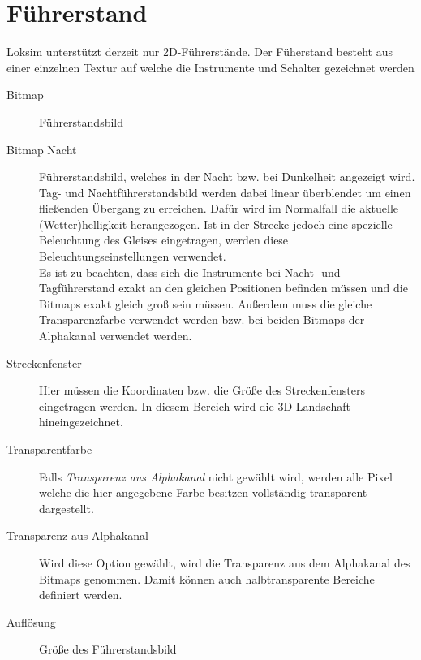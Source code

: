 \section{Führerstand}
\label{sect.editor.lok.fst}
Loksim unterstützt derzeit nur 2D-Führerstände. Der Füherstand besteht aus einer einzelnen Textur auf welche die Instrumente und Schalter gezeichnet werden
\begin{description}
\item[Bitmap] Führerstandsbild
\item[Bitmap Nacht] Führerstandsbild, welches in der Nacht bzw. bei Dunkelheit angezeigt wird. Tag- und Nachtführerstandsbild werden dabei linear überblendet um einen fließenden Übergang zu erreichen. Dafür wird im Normalfall die aktuelle (Wetter)helligkeit herangezogen. Ist in der Strecke jedoch eine spezielle Beleuchtung des Gleises eingetragen, werden diese Beleuchtungseinstellungen verwendet.\\
Es ist zu beachten, dass sich die Instrumente bei Nacht- und Tagführerstand exakt an den gleichen Positionen befinden müssen und die Bitmaps exakt gleich groß sein müssen. Außerdem muss die gleiche Transparenzfarbe verwendet werden bzw. bei beiden Bitmaps der Alphakanal verwendet werden.
\item[Streckenfenster] Hier müssen die Koordinaten bzw. die Größe des Streckenfensters eingetragen werden. In diesem Bereich wird die 3D-Landschaft hineingezeichnet.
\item[Transparentfarbe] Falls \emph{Transparenz aus Alphakanal} nicht gewählt wird, werden alle Pixel welche die hier angegebene Farbe besitzen vollständig transparent dargestellt.
\item[Transparenz aus Alphakanal] Wird diese Option gewählt, wird die Transparenz aus dem Alphakanal des Bitmaps genommen. Damit können auch halbtransparente Bereiche definiert werden.
\item[Auflösung] Größe des Führerstandsbild
\end{description}